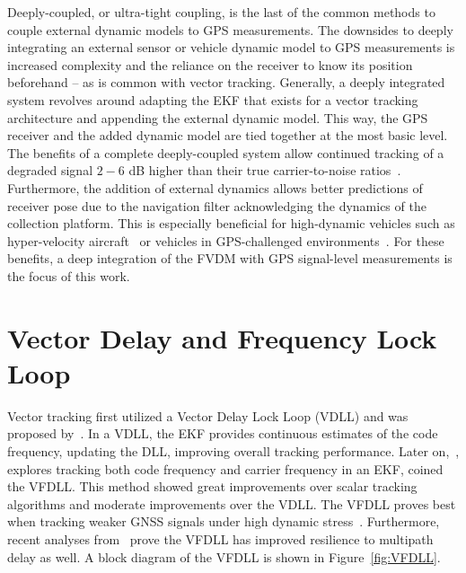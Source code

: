 {Deeply-coupled}, or ultra-tight coupling, is the last of the common methods to couple external dynamic models to GPS measurements. The downsides to deeply integrating an external sensor or vehicle dynamic model to GPS measurements is increased complexity and the reliance on the receiver to know its position beforehand {--} as is common with vector tracking. Generally, a deeply integrated system revolves around adapting the EKF that exists for a vector tracking architecture and appending the external dynamic model. This way, the GPS receiver and the added dynamic model are tied together at the most basic level. The benefits of a complete deeply-coupled system allow continued tracking of a degraded signal \(2-6\) dB higher than their true carrier-to-noise ratios~\cite{wattsGPSGLONASSL12019}. Furthermore, the addition of external dynamics allows better predictions of receiver pose due to the navigation filter acknowledging the dynamics of the collection platform. This is especially beneficial for high-dynamic vehicles such as hyper-velocity aircraft~\cite{pozzobonSupersonicGNSSAuthentication2014} or vehicles in GPS-challenged environments~\cite{martinGPSCarrierPhase2017}. For these benefits, a deep integration of the FVDM with GPS signal-level measurements is the focus of this work.

\section{\textbf{Vector Delay and Frequency Lock Loop}}
Vector tracking first utilized a Vector Delay Lock Loop (VDLL) and was proposed by~\cite{e.m.coppsOptimalProcessingGPS1980}. In a VDLL\@, the EKF provides continuous estimates of the code frequency, updating the DLL, improving overall tracking performance. Later on,~\cite{bradfordparkinsonGlobalPositioningSystem1996}, explores tracking both code frequency and carrier frequency in an EKF, coined the VFDLL\@. This method showed great improvements over scalar tracking algorithms and moderate improvements over the VDLL\@. The VFDLL proves best when tracking weaker GNSS signals under high dynamic stress~\cite{lashleyPerformanceAnalysisVector2009}. Furthermore, recent analyses from~\cite{ziedanMultipathChannelEstimation2012} prove the VFDLL has improved resilience to multipath delay as well. A block diagram of the VFDLL is shown in Figure~\ref{fig:VFDLL}.

